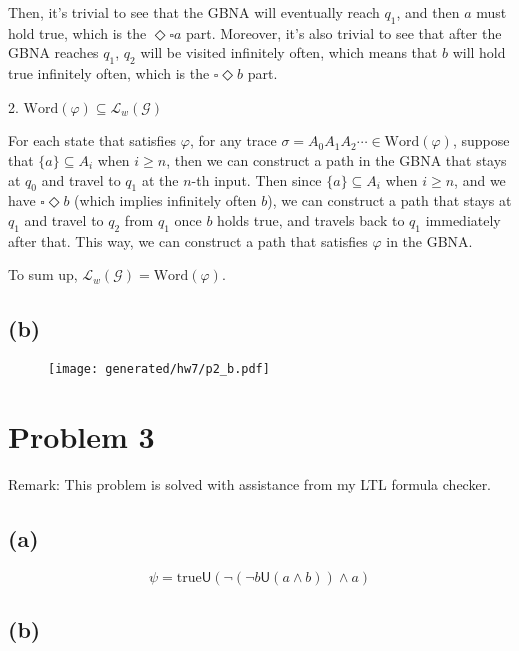 Then, it's trivial to see that the GBNA will eventually reach $q_1$, and then $a$ must hold true,
which is the $\Diamond \square a$ part.
Moreover, it's also trivial to see that after the GBNA reaches $q_1$, $q_2$ will be visited infinitely often,
which means that $b$ will hold true infinitely often, which is the $\square \Diamond b$ part.

2. $\text{Word}(\varphi) \subseteq \mathcal{L}_w(\mathcal{G})$

For each state that satisfies $\varphi$, for any trace $\sigma=A_0 A_1 A_2 \cdots \in \text{Word}(\varphi)$,
suppose that $\{a\} \subseteq A_i$ when $i \geq n$, then we can construct a path in the GBNA that stays at
$q_0$ and travel to $q_1$ at the $n$-th input. Then since $\{a\} \subseteq A_i$ when $i \geq n$, and we have
$\square \Diamond b$ (which implies infinitely often $b$), we can construct a path that stays at $q_1$ and
travel to $q_2$ from $q_1$ once $b$ holds true, and travels back to $q_1$ immediately after that.
This way, we can construct a path that satisfies $\varphi$ in the GBNA.

To sum up, $\mathcal{L}_w(\mathcal{G}) = \text{Word}(\varphi)$.

\subsection*{(b)}

\begin{figure}[H]
    \centering
    \texttt{[image: generated/hw7/p2\_b.pdf]}
\end{figure}

\section{Problem 3}

Remark: This problem is solved with assistance from my LTL formula checker.

\subsection*{(a)}

$$
\psi = \text{true} \mathsf{U} (\neg (\neg b \mathsf{U}  (a \wedge b)) \wedge a)
$$

\subsection*{(b)}

